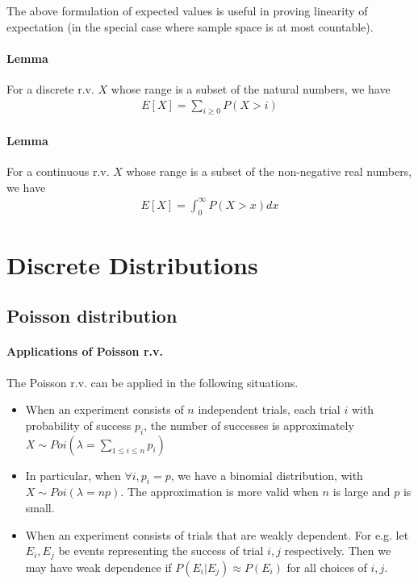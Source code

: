 \documentclass{article}
\begin{document}
The above formulation of expected values is useful in proving linearity of expectation (in the special case where sample space is at most countable).

\paragraph{Lemma} For a discrete r.v. $X$ whose range is a subset of the natural numbers, we have
\begin{align*}
	E[X] = \sum_{i\geq 0}P(X > i)
\end{align*}

\paragraph{Lemma} For a continuous r.v. $X$ whose range is a subset of the non-negative real numbers, we have
\begin{align*}
	E[X] = \int_0^{\infty} P(X > x) dx
\end{align*}

\section{Discrete Distributions}
\subsection{Poisson distribution}
\paragraph{Applications of Poisson r.v.} The Poisson r.v. can be applied in the following situations.
\begin{itemize}
	\item When an experiment consists of $n$ independent trials, each trial $i$ with probability of success $p_i$, the number of successes is approximately $X\sim Poi(\lambda = \sum_{1\leq i\leq n} p_i)$
	\item In particular, when $\forall i, p_i = p$, we have a binomial distribution, with $X\sim Poi(\lambda = np)$. The approximation is more valid when $n$ is large and $p$ is small.
	\item When an experiment consists of trials that are weakly dependent. For e.g. let $E_i, E_j$ be events representing the success of trial $i, j$ respectively. Then we may have weak dependence if $P(E_i | E_j)\approx P(E_i)$ for all choices of $i, j$.
\end{itemize}
\end{document}
